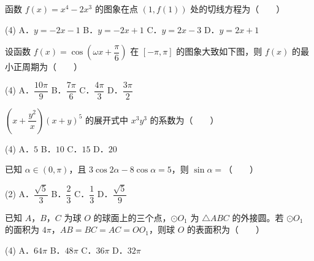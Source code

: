 \begin{question}
函数 $f(x)=x^{4}-2x^{3}$ 的图象在点 $(1,f(1))$ 处的切线方程为\mbox{（　　）}

\begin{gkopts}(4)
\task A．$y=-2x-1$
\task B．$y=-2x+1$
\task C．$y=2x-3$
\task D．$y=2x+1$
\end{gkopts}

\Needspace{0.4\textheight}
\end{question}
\begin{question}
设函数 $f(x)=\cos\left(\omega x+\dfrac\pi6\right)$ 在 $[-\pi,\pi]$ 的图象大致如下图，则 $f(x)$ 的最小正周期为\mbox{（　　）}
\nopagebreak[4]
\begin{center}\end{center}
\nopagebreak[4]
\begin{gkopts}(4)
\task A．$\dfrac{10\pi}9$
\task B．$\dfrac{7\pi}6$
\task C．$\dfrac{4\pi}3$
\task D．$\dfrac{3\pi}2$
\end{gkopts}

\end{question}
\begin{question}
$\left(x+\dfrac{y^{2}}x\right)(x+y)^{5}$ 的展开式中 $x^{3}y^{3}$ 的系数为\mbox{（　　）}

\begin{gkopts}(4)
\task A．$5$
\task B．$10$
\task C．$15$
\task D．$20$
\end{gkopts}

\end{question}
\begin{question}
已知 $\alpha\in(0,\pi)$，且 $3\cos2\alpha-8\cos\alpha=5$，则 $\sin\alpha=$\mbox{（　　）}

\begin{gkopts}(2)
\task A．$\dfrac{\sqrt5}3$
\task B．$\dfrac23$
\task C．$\dfrac13$
\task D．$\dfrac{\sqrt5}9$
\end{gkopts}

\end{question}
\begin{question}
已知 $A$，$B$，$C$ 为球 $O$ 的球面上的三个点，$\odot O_1$ 为 $\triangle ABC$ 的外接圆。若 $\odot O_1$ 的面积为 $4\pi$，$AB=BC=AC=OO_1$，则球 $O$ 的表面积为\mbox{（　　）}

\begin{gkopts}(4)
\task A．$64\pi$
\task B．$48\pi$
\task C．$36\pi$
\task D．$32\pi$
\end{gkopts}

\end{question}
